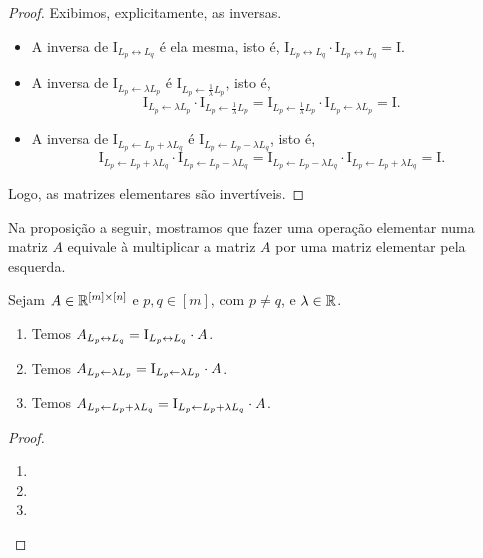 \begin{proof}
    Exibimos, explicitamente, as inversas.
        \begin{itemize}
            \item A inversa de $\mathrm{I}_{L_p \leftrightarrow L_q}$ é ela mesma, isto é, $\mathrm{I}_{L_p \leftrightarrow L_q} \cdot \mathrm{I}_{L_p \leftrightarrow L_q} = \mathrm{I}$.
            \item A inversa de $\mathrm{I}_{L_p \leftarrow \lambda L_p}$ é $\mathrm{I}_{L_p \leftarrow \frac{1}{\lambda} L_p}$, isto é,
                \[
                    \mathrm{I}_{L_p \leftarrow \lambda L_p} \cdot \mathrm{I}_{L_p \leftarrow \frac{1}{\lambda} L_p} = \mathrm{I}_{L_p \leftarrow \frac{1}{\lambda} L_p} \cdot \mathrm{I}_{L_p \leftarrow \lambda L_p} = \mathrm{I}.
                \]
            \item A inversa de $\mathrm{I}_{L_p \leftarrow L_p + \lambda L_q}$ é $\mathrm{I}_{L_p \leftarrow L_p -\lambda L_q}$, isto é,
                \[
                    \mathrm{I}_{L_p \leftarrow L_p + \lambda L_q} \cdot \mathrm{I}_{L_p \leftarrow L_p - \lambda L_q} = \mathrm{I}_{L_p \leftarrow L_p - \lambda L_q} \cdot \mathrm{I}_{L_p \leftarrow L_p + \lambda L_q} = \mathrm{I}.
                \]
        \end{itemize}
    Logo, as matrizes elementares são invertíveis. \blackproof
\end{proof}

Na proposição a seguir, mostramos que fazer uma operação elementar numa matriz $A$ equivale à multiplicar a matriz $A$ por uma matriz elementar pela esquerda.

\begin{proposition}
    Sejam $A \in \mathbb{R}^{[m] \times [n]}$ e $p, q \in [m]$, com $p \neq q$, e $\lambda \in \mathbb{R}$.
        \begin{enumerate}[leftmargin=*, align=left, label=\textbf{(\alph*)}]
            \item Temos $\displaystyle A_{L_p \leftrightarrow L_q} = \mathrm{I}_{L_p \leftrightarrow L_q} \cdot A$.
            \item Temos $\displaystyle A_{L_p \leftarrow \lambda L_p} = \mathrm{I}_{L_p \leftarrow \lambda L_p} \cdot A$.
            \item Temos $\displaystyle A_{L_p \leftarrow L_p + \lambda L_q} = \mathrm{I}_{L_p \leftarrow L_p + \lambda L_q} \cdot A$.
        \end{enumerate}
\end{proposition}

\begin{proof}
    \leavevmode
        \begin{enumerate}[leftmargin=*, align=left, label=\textbf{(\alph*)}]
            \item
            \item
            \item
        \end{enumerate}
\end{proof}

